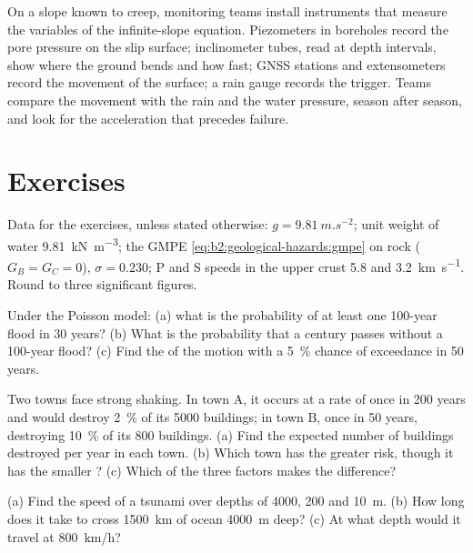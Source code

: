 \begin{inthefield}
On a slope known to creep, monitoring teams install instruments that measure the variables of the
infinite-slope equation. Piezometers in boreholes record the pore pressure on the slip surface;
inclinometer tubes, read at depth intervals, show where the ground bends and how fast; GNSS
stations and extensometers record the movement of the surface; a rain gauge records the trigger.
Teams compare the movement with the rain and the water pressure, season after season, and look
for the acceleration that precedes failure.
\end{inthefield}

\section*{Exercises}\label{sec:b2:geological-hazards:exercises}

Data for the exercises, unless stated otherwise: $g = \qty{9.81}{m.s^{-2}}$; unit weight of water
\qty{9.81}{kN.m^{-3}}; the GMPE \eqref{eq:b2:geological-hazards:gmpe} on rock ($G_B = G_C = 0$),
$\sigma = 0.230$; P and S speeds in the upper crust 5.8 and \qty{3.2}{km.s^{-1}}. Round to three
significant figures.

\begin{exercise}[$\star$]\label{exo:b2:geological-hazards:1}
Under the Poisson model: (a) what is the probability of at least one 100-year flood in 30 years?
(b) What is the probability that a century passes without a 100-year flood? (c) Find the  of the motion with a \qty{5}{\percent} chance of exceedance in 50 years.
\end{exercise}

\begin{exercise}[$\star$]\label{exo:b2:geological-hazards:2}
Two towns face strong shaking. In town A, it occurs at a rate of once in 200 years and would
destroy \qty{2}{\percent} of its 5000 buildings; in town B, once in 50 years, destroying
\qty{10}{\percent} of its 800 buildings. (a) Find the expected number of buildings destroyed per
year in each town. (b) Which town has the greater risk, though it has the smaller ? (c)
Which of the three factors makes the difference?
\end{exercise}

\begin{exercise}[$\star$]\label{exo:b2:geological-hazards:3}
(a) Find the speed of a tsunami over depths of 4000, 200 and \qty{10}{m}. (b) How long does it
take to cross \qty{1500}{km} of ocean \qty{4000}{m} deep? (c) At what depth would it travel at
\qty{800}{km/h}?
\end{exercise}

